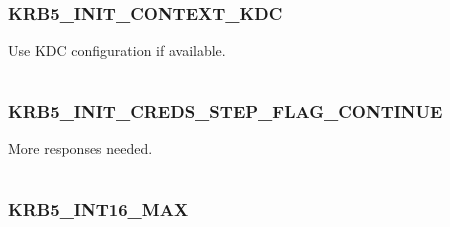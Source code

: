 \documentclass[letterpaper,10pt,english]{sphinxmanual}
\begin{document}
\subsubsection{KRB5\_INIT\_CONTEXT\_KDC}
\label{appdev/refs/macros/KRB5_INIT_CONTEXT_KDC:krb5-init-context-kdc}\label{appdev/refs/macros/KRB5_INIT_CONTEXT_KDC::doc}\label{appdev/refs/macros/KRB5_INIT_CONTEXT_KDC:krb5-init-context-kdc-data}

\begin{fulllineitems}
\label{appdev/refs/macros/KRB5_INIT_CONTEXT_KDC:KRB5_INIT_CONTEXT_KDC}
\end{fulllineitems}


Use KDC configuration if available.

\begin{tabulary}{\linewidth}{|L|L|}
\hline

 & 
\\
\hline\end{tabulary}



\subsubsection{KRB5\_INIT\_CREDS\_STEP\_FLAG\_CONTINUE}
\label{appdev/refs/macros/KRB5_INIT_CREDS_STEP_FLAG_CONTINUE:krb5-init-creds-step-flag-continue-data}\label{appdev/refs/macros/KRB5_INIT_CREDS_STEP_FLAG_CONTINUE:krb5-init-creds-step-flag-continue}\label{appdev/refs/macros/KRB5_INIT_CREDS_STEP_FLAG_CONTINUE::doc}

\begin{fulllineitems}
\label{appdev/refs/macros/KRB5_INIT_CREDS_STEP_FLAG_CONTINUE:KRB5_INIT_CREDS_STEP_FLAG_CONTINUE}
\end{fulllineitems}


More responses needed.

\begin{tabulary}{\linewidth}{|L|L|}
\hline

 & 
\\
\hline\end{tabulary}



\subsubsection{KRB5\_INT16\_MAX}
\label{appdev/refs/macros/KRB5_INT16_MAX:krb5-int16-max-data}\label{appdev/refs/macros/KRB5_INT16_MAX::doc}\label{appdev/refs/macros/KRB5_INT16_MAX:krb5-int16-max}
\end{document}
